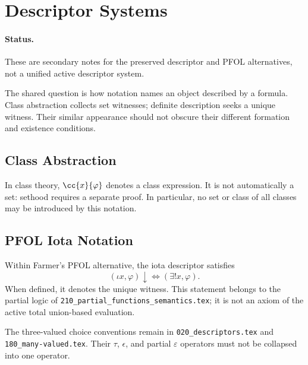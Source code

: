 \def\topic{Descriptor Systems: Alternative Draft}

\section{Descriptor Systems}

\paragraph{Status.}
These are secondary notes for the preserved descriptor and PFOL alternatives,
not a unified active descriptor system.

The shared question is how notation names an object described by a formula.
Class abstraction collects set witnesses; definite description seeks a
unique witness. Their similar appearance should not obscure their different
formation and existence conditions.

\subsection{Class Abstraction}
In class theory, $\cc{x}{\varphi}$ denotes a class expression. It is not
automatically a set: sethood requires a separate proof. In particular, no
set or class of all classes may be introduced by this notation.

\subsection{PFOL Iota Notation}
Within Farmer's PFOL alternative, the iota descriptor satisfies
\[
(\iota x,\varphi)\downarrow\iff(\exists!x,\varphi).
\]
When defined, it denotes the unique witness. This statement belongs to the
partial logic of \texttt{210\_partial\_functions\_semantics.tex}; it is not an
axiom of the active total union-based evaluation.

The three-valued choice conventions remain in
\texttt{020\_descriptors.tex} and \texttt{180\_many-valued.tex}. Their
$\tau$, $\epsilon$, and partial $\varepsilon$ operators must not be collapsed
into one operator.


